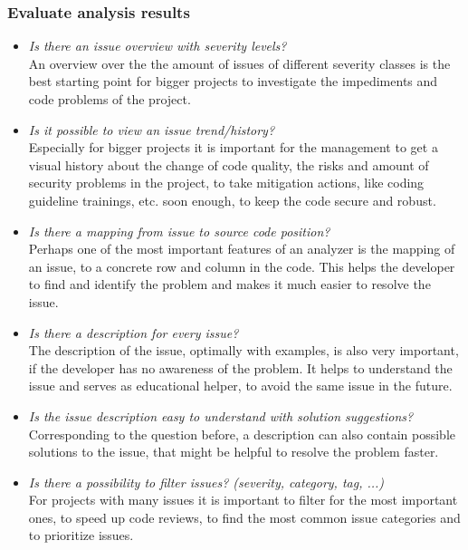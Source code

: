 \documentclass[conference]{IEEEtran}
\begin{document}
\subsubsection{Evaluate analysis results}
\label{subsubsec:evaluation_results}
\begin{itemize}
	\item \textit{Is there an issue overview with severity levels?} \\
	An overview over the the amount of issues of different severity classes is the best starting point for bigger projects to investigate the impediments and code problems of the project.
	
	\item \textit{Is it possible to view an issue trend/history?} \\
	Especially for bigger projects it is important for the management to get a visual history about the change of code quality, the risks and amount of security problems in the project, to take mitigation actions, like coding guideline trainings, etc. soon enough, to keep the code secure and robust.	
	
	\item \textit{Is there a mapping from issue to source code position?} \\
	Perhaps one of the most important features of an analyzer is the mapping of an issue, to a concrete row and column in the code.
	This helps the developer to find and identify the problem and makes it much easier to resolve the issue.
	
	\item \textit{Is there a description for every issue?} \\
	The description of the issue, optimally with examples, is also very important, if the developer has no awareness of the problem.
	It helps to understand the issue and serves as educational helper, to avoid the same issue in the future.
	
	\item \textit{Is the issue description easy to understand with solution suggestions?} \\
	Corresponding to the question before, a description can also contain possible solutions to the issue, that might be helpful to resolve the problem faster.
	
	\item \textit{Is there a possibility to filter issues? (severity, category, tag, ...)} \\
	For projects with many issues it is important to filter for the most important ones, to speed up code reviews, to find the most common issue categories and to prioritize issues.
\end{itemize}
\end{document}

